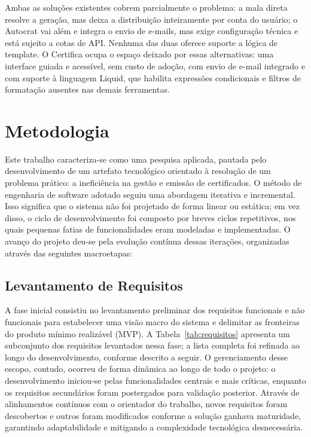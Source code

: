 \documentclass[article,a4paper,12pt,brazil,sumario=tradicional]{abntex2}
\begin{document}
Ambas as soluções existentes cobrem parcialmente o problema: a mala direta resolve a geração, mas deixa a distribuição inteiramente por conta do usuário; o Autocrat vai além e integra o envio de e-mails, mas exige configuração técnica e está sujeito a cotas de API. Nenhuma das duas oferece suporte a lógica de template. O Certifica ocupa o espaço deixado por essas alternativas: uma interface guiada e acessível, sem custo de adoção, com envio de e-mail integrado e com suporte à linguagem Liquid, que habilita expressões condicionais e filtros de formatação ausentes nas demais ferramentas.

\section{Metodologia}\label{sec:metodologia}

Este trabalho caracteriza-se como uma pesquisa aplicada, pautada pelo desenvolvimento de um artefato tecnológico orientado à resolução de um problema prático: a ineficiência na gestão e emissão de certificados. O método de engenharia de software adotado seguiu uma abordagem iterativa e incremental. Isso significa que o sistema não foi projetado de forma linear ou estática; em vez disso, o ciclo de desenvolvimento foi composto por breves ciclos repetitivos, nos quais pequenas fatias de funcionalidades eram modeladas e implementadas. O avanço do projeto deu-se pela evolução contínua dessas iterações, organizadas através das seguintes macroetapas:

\subsection{Levantamento de Requisitos}

A fase inicial consistiu no levantamento preliminar dos requisitos funcionais e não funcionais para estabelecer uma visão macro do sistema e delimitar as fronteiras do produto mínimo realizável (MVP). A Tabela~\ref{tab:requisitos} apresenta um subconjunto dos requisitos levantados nessa fase; a lista completa foi refinada ao longo do desenvolvimento, conforme descrito a seguir. O gerenciamento desse escopo, contudo, ocorreu de forma dinâmica ao longo de todo o projeto: o desenvolvimento iniciou-se pelas funcionalidades centrais e mais críticas, enquanto os requisitos secundários foram postergados para validação posterior. Através de alinhamentos contínuos com o orientador do trabalho, novos requisitos foram descobertos e outros foram modificados conforme a solução ganhava maturidade, garantindo adaptabilidade e mitigando a complexidade tecnológica desnecessária.
\end{document}
